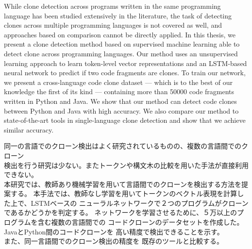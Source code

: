 \begin{eabstract}
While clone detection across programs written in the same programming language
has been studied extensively in the literature, the task of detecting clones
across multiple programming languages is not covered as well, and approaches
based on comparison cannot be directly applied.
In this thesis, we present a clone detection method based on supervised
machine learning able to detect clone across programming languages.
Our method uses an unsupervised learning approach to learn token-level vector
representations and an LSTM-based neural network to predict if two code
fragments are clones. To train our network, we present a cross-language code
clone dataset --- which is to the best of our knowledge the first of its kind
--- containing more than 50000 code fragments written in Python and Java.
We show that our method can detect code clones between Python and Java with high
accuracy. We also compare our method to state-of-the-art tools in
single-language clone detection and show that we achieve similar accuracy.
\end{eabstract}

\begin{jabstract}
同一の言語でのクローン検出はよく研究されているものの、複数の言語間でのクローン\\%
検出を行う研究は少ない。またトークンや構文木の比較を用いた手法が直接利用できない。\\%
本研究では、教師あり機械学習を用いて言語間でのクローンを検出する方法を提案する。%
本手法では、教師なし学習を用いてトークンのベクトル表現を計算した上で、LSTMベースの%
ニューラルネットワークで２つのプログラムがクローンであるかどうかを判定する。%
ネットワークを学習させるために、５万以上のプログラムを含む複数の言語間での%
コードクローンのデータセットを作成した。JavaとPython間のコードクローンを%
高い精度で検出できることを示す。\\%
また、同一言語間でのクローン検出の精度を%
既存のツールと比較する。
\end{jabstract}
